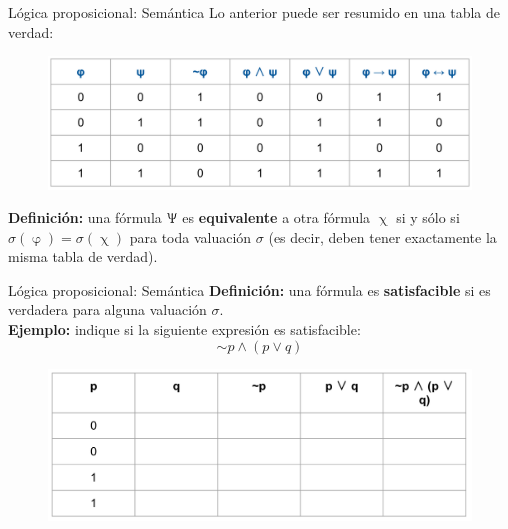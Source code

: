 \documentclass{beamer}
\begin{document}
\begin{frame}{Lógica proposicional: Semántica}
  Lo anterior puede ser resumido en una tabla de verdad:
  \begin{figure}
    \centering
    \includegraphics[width=1.\textwidth]{images/resumen_tabla_de_verdad.png}
  \end{figure}

  \textbf{Definición:} una fórmula $\Uppsi$ es \textbf{equivalente} a otra
  fórmula $\upchi$ si y sólo si $\sigma(\upvarphi) = \sigma(\upchi)$ para toda
  valuación $\sigma$ (es decir, deben tener exactamente la misma tabla de
  verdad).
\end{frame}


\begin{frame}{Lógica proposicional: Semántica}
  \textbf{Definición:} una fórmula es \textbf{satisfacible} si es verdadera para
  alguna valuación $\sigma$.\\

  \textbf{Ejemplo:} indique si la siguiente expresión es satisfacible:
  $$\sim p \land (p \vee q)$$

  \begin{figure}
    \centering
    \includegraphics[width=1.\textwidth]{images/tabla_de_verdad_01_blanco.png}
  \end{figure}
\end{frame}
\end{document}

